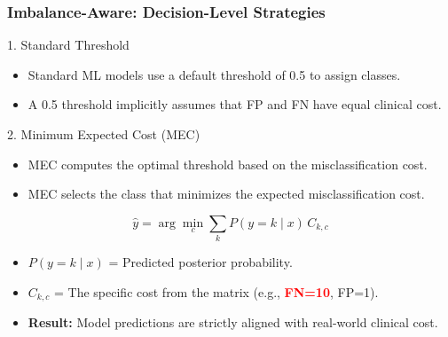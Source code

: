 \documentclass[aspectratio=169,xcolor=dvipsnames]{beamer}
\begin{document}
\begin{frame}
\frametitle{Imbalance-Aware: Decision-Level Strategies}

    \begin{block}{1. Standard Threshold}
    	\begin{itemize}
    		\item Standard ML models use a default threshold of 0.5 to assign classes.
    		\item A 0.5 threshold implicitly assumes that FP and FN have equal clinical cost.
    	\end{itemize}
    \end{block}
    
    \begin{block}{2. Minimum Expected Cost (MEC) \cite{elkan2001}}
    	\begin{itemize}
    		\item MEC computes the optimal threshold based on the misclassification cost.
    		\item MEC selects the class that minimizes the expected misclassification cost.
    	\end{itemize}
    	
    	        $$ \hat{y} = \arg\min_{c} \sum_{k} P(y=k \mid x)\, C_{k,c} $$
        
        \begin{itemize}
            \item $P(y=k \mid x)$ = Predicted posterior probability.
            \item $C_{k,c}$ = The specific cost from the matrix (e.g., \textcolor{red}{\textbf{FN=10}}, FP=1).
            \item \textbf{Result:} Model predictions are strictly aligned with real-world clinical cost.
        \end{itemize}
    \end{block}
   
\end{frame}

\end{document}
